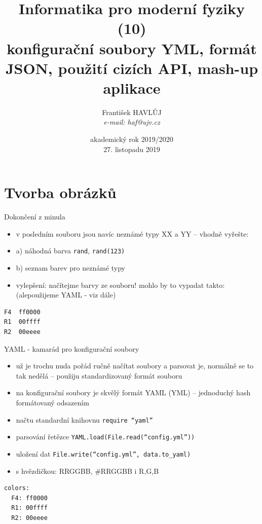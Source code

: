 \documentclass{beamer}
\title[IMF (10)]{Informatika pro moderní fyziky (10)\\ konfigurační soubory YML, formát JSON, použití cizích API, mash-up aplikace}
\author[Franti\v{s}ek HAVL\r{U}J, ORF ÚJV Řež]{Franti\v{s}ek HAVL\r{U}J\\{\scriptsize \emph{e-mail: haf@ujv.cz}}}
\date{akademický rok 2019/2020\\27. listopadu 2019}
\institute[ORF ÚJV Řež]
{ÚJV Řež\\oddělení Reaktorové fyziky a podpory palivového cyklu}
\begin{document}
\begin{frame}
  \titlepage
\end{frame}

\begin{frame}
  \tableofcontents
\end{frame}

\section{Tvorba obrázků}

\begin{frame}[fragile]{Dokončení z minula}
  \begin{itemize}
    \item v posledním souboru jsou navíc neznámé typy XX a YY -- vhodně vyřešte:
    \item a) náhodná barva \texttt{rand}, \texttt{rand(123)}
    \item b) seznam barev pro neznámé typy
    \item vylepšení: načítejme barvy ze souboru! mohlo by to vypadat takto: (alepoužijeme YAML - viz dále)
  \end{itemize}
\begin{verbatim}
F4  ff0000
R1  00ffff
R2  00eeee
\end{verbatim}
\end{frame}

\begin{frame}[fragile]{YAML - kamarád pro konfigurační soubory}
  \begin{itemize}
    \item už je trochu nuda pořád ručně načítat soubory a parsovat je, normálně se to tak nedělá – použiju standardizovaný formát souboru
    \item na konfigurační soubory je skvělý formát YAML (YML) – jednoduchý hash formátovaný odsazením
    \item načtu standardní knihovnu \texttt{require ``yaml''}
    \item parsování řetězce \texttt{YAML.load(File.read(``config.yml''))}
    \item uložení dat \texttt{File.write(``config.yml'', data.to\_yaml)}
    \item s hvězdičkou: RRGGBB, \#RRGGBB i R,G,B
  \end{itemize}
\begin{verbatim}
colors:
  F4: ff0000
  R1: 00ffff
  R2: 00eeee
\end{verbatim}
\end{frame}
\end{document}

